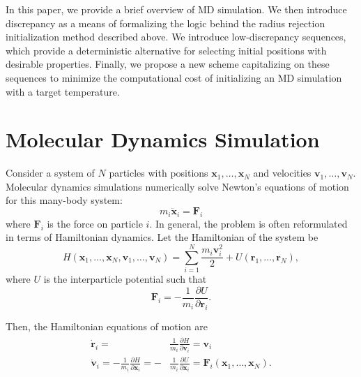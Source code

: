 \documentclass{article}
\begin{document}
In this paper, we provide a brief overview of MD simulation. We then introduce discrepancy as a means of formalizing the logic behind the radius rejection initialization method described above. We introduce low-discrepancy sequences, which provide a deterministic alternative for selecting initial positions with desirable properties. Finally, we propose a new scheme capitalizing on these sequences to minimize the computational cost of initializing an MD simulation with a target temperature.

\section{Molecular Dynamics Simulation}

Consider a system of $N$ particles with positions $\mathbf{x}_1,\dots,\mathbf{x}_N$ and velocities $\mathbf{v}_1,\dots,\mathbf{v}_N$. Molecular dynamics simulations numerically solve Newton's equations of motion for this many-body system:
\begin{equation}
m_i \ddot{\mathbf{x}}_i=\mathbf{F}_i
\end{equation}where $\mathbf{F}_i$ is the force on particle $i$. In general, the problem is often reformulated in terms of Hamiltonian dynamics. Let the Hamiltonian of the system be
\begin{equation}
H(\mathbf{x}_1,\dots,\mathbf{x}_N,\mathbf{v}_1,\dots,\mathbf{v}_N)=\sum_{i=1}^N \frac{m_i \mathbf{v}_i^2}{2}+U(\mathbf{r}_1,\dots,\mathbf{r}_N),
\end{equation}where $U$ is the interparticle potential such that
\begin{equation}
\mathbf{F}_i=-\frac{1}{m_i}\frac{\partial U}{\partial \mathbf{r}_i}.
\end{equation}

Then, the Hamiltonian equations of motion are
\begin{align}
\begin{split}
\dot{\mathbf{r}}_i=&\frac{1}{m_i}\frac{\partial H}{\partial \mathbf{v}_i}=\mathbf{v}_i\\
\dot{\mathbf{v}}_i=-\frac{1}{m_i}\frac{\partial H}{\partial \mathbf{x}_i}=-&\frac{1}{m_i}\frac{\partial U}{\partial \mathbf{x}_i}=\mathbf{F}_i(\mathbf{x}_1,\dots,\mathbf{x}_N).
\end{split}\label{hamiltonian}
\end{align}
\end{document}
